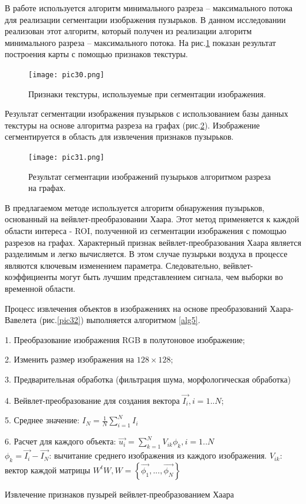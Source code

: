 \documentclass[a4paper,14pt]{extreport}
\begin{document}
В работе используется алгоритм минимального разреза -- максимального потока для реализации сегментации изображения пузырьков. В данном исследовании реализован этот алгоритм, который получен из реализации алгоритм минимального разреза -- максимального потока. На рис.\ref{pic30} показан результат построения карты с помощью признаков текстуры.

\begin{figure}[ht!]
\centering
\texttt{[image: pic30.png]}
\caption{Признаки текстуры, используемые при сегментации изображения.}
	\label{pic30}
	\end{figure}
	
	Результат сегментации изображения пузырьков с использованием базы данных текстуры на основе алгоритма разреза на графах (рис.\ref{pic31}). Изображение сегментируется в область для извлечения признаков пузырьков.
\begin{figure}[ht!]
\centering
\texttt{[image: pic31.png]}
\caption{Результат сегментации изображений пузырьков алгоритмом разреза на графах.}
	\label{pic31}
	\end{figure}

В предлагаемом методе используется алгоритм обнаружения пузырьков, основанный на вейвлет-преобразовании Хаара. Этот метод применяется к каждой области интереса - ROI, полученной из сегментации изображения с помощью разрезов на графах. Характерный признак вейвлет-преобразования Хаара является разделимым и легко вычисляется. В этом случае пузырьки воздуха в процессе являются ключевым изменением параметра. Следовательно, вейвлет-коэффициенты могут быть лучшим представлением сигнала, чем выборки во временной области.

Процесс извлечения объектов в изображениях на основе преобразований Хаара-Вавелета (рис.\ref{pic32}) выполняется алгоритмом \ref{alg5}.

\begin{algorithm}[ht!]
		1. Преобразование изображения RGB в полутоновое изображение;
		
		2. Изменить размер изображения на $128 \times 128$;
		
		3. Предварительная обработка (фильтрация шума, морфологическая обработка)
		
		4. Вейвлет-преобразование для создания вектора $\vec{I_i}, i=1..N$;
		
		5. Среднее значение: $I_N=\frac{1}{N}\sum_{i=1}^N I_i$
		
		6. Расчет для каждого объекта: $\vec{u_i}=\sum_{k=1}^N V_{ik} \phi_k, i=1..N$\\
		$\phi_k=\vec{I_i}-\vec{I_N}$: вычитание среднего изображения из каждого изображения.
			$V_{ik}$: вектор каждой матрицы $W^tW, W=\left\{\vec{\phi_1},...,\vec{\phi_N}\right\} $
  \caption{Извлечение признаков пузырей вейвлет-преобразованием Хаара}\label{alg5}
\end{algorithm}
\end{document}
